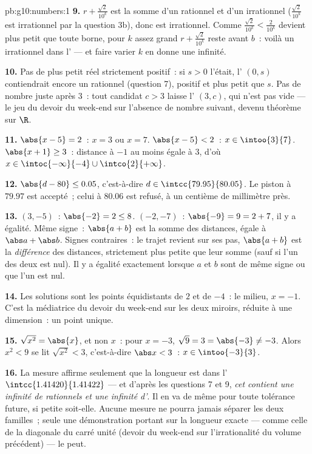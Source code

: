 \begin{solution}{pb:g10:numbers:1}
\textbf{9.} $r + \frac{\sqrt2}{10^k}$ est la somme d'un rationnel et
d'un irrationnel ($\frac{\sqrt2}{10^k}$ est irrationnel par la
question 3b), donc est irrationnel. Comme
$\frac{\sqrt2}{10^k} < \frac{2}{10^k}$ devient plus petit que toute
borne, pour $k$ assez grand $r + \frac{\sqrt2}{10^k}$ reste avant
$b$~: voilà un irrationnel dans l' --- et faire varier $k$
en donne une infinité.

\textbf{10.} Pas de plus petit réel strictement positif~: si $s > 0$
l'était, l' $(0, s)$ contiendrait encore un rationnel
(question 7), positif et plus petit que $s$. Pas de nombre juste après
$3$~: tout candidat $c > 3$ laisse l' $(3, c)$, qui n'est pas
vide --- le jeu du devoir du week-end sur l'absence de nombre suivant,
devenu théorème sur $\R$.

\textbf{11.} $\abs{x - 5} = 2$~: $x = 3$ ou $x = 7$.
$\abs{x - 5} < 2$~: $x \in \intoo{3}{7}$.
$\abs{x + 1} \geq 3$~: distance à $-1$ au moins égale à $3$, d'où
$x \in \intoc{-\infty}{-4} \cup \intco{2}{+\infty}$.

\textbf{12.} $\abs{d - 80} \leq 0.05$, c'est-à-dire
$d \in \intcc{79.95}{80.05}$. Le piston à $79.97$ est accepté~; celui
à $80.06$ est refusé, à un centième de millimètre près.

\textbf{13.} $(3, -5)$~: $\abs{-2} = 2 \leq 8$. $(-2, -7)$~:
$\abs{-9} = 9 = 2 + 7$, il y a égalité. Même signe~: $\abs{a + b}$ est
la somme des distances, égale à $\abs a + \abs b$. Signes contraires~:
le trajet revient sur ses pas, $\abs{a + b}$ est la \emph{différence}
des distances, strictement plus petite que leur somme (sauf si l'un
des deux est nul). Il y a égalité exactement lorsque $a$ et $b$ sont
de même signe ou que l'un est nul.

\textbf{14.} Les solutions sont les points équidistants de $2$ et de
$-4$~: le milieu, $x = -1$. C'est la médiatrice du devoir du week-end
sur les deux miroirs, réduite à une dimension~: un point unique.

\textbf{15.} $\sqrt{x^2} = \abs{x}$, et non $x$~: pour $x = -3$,
$\sqrt{9} = 3 = \abs{-3} \neq -3$. Alors $x^2 < 9$ se lit
$\sqrt{x^2} < 3$, c'est-à-dire $\abs x < 3$~: $x \in \intoo{-3}{3}$.

\textbf{16.} La mesure affirme seulement que la longueur est dans
l' $\intcc{1.41420}{1.41422}$ --- et d'après les questions 7
et 9, \emph{cet  contient une infinité de rationnels et une
infinité d'}. Il en va de même pour toute tolérance
future, si petite soit-elle. Aucune mesure ne pourra jamais séparer
les deux familles~; seule une démonstration portant sur la longueur
exacte --- comme celle de la diagonale du carré unité (devoir du
week-end sur l'irrationalité du volume précédent) --- le peut.


\end{solution}

